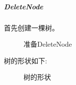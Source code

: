\documentclass[supercite]{Experimental_Report}
\theoremstyle{definition}
\begin{document}
\clearpage
\subparagraph{DeleteNode}
\noindent
首先创建一棵树。
\begin{figure}[htbp]
	\centering
	\centering
	\caption{准备DeleteNode}
	\label{fig5-37}
\end{figure}

\noindent
树的形状如下:
\begin{figure}[H]
	\centering
	\centering
	\caption{树的形状}
	\label{fig5-38}
\end{figure}
\end{document}
